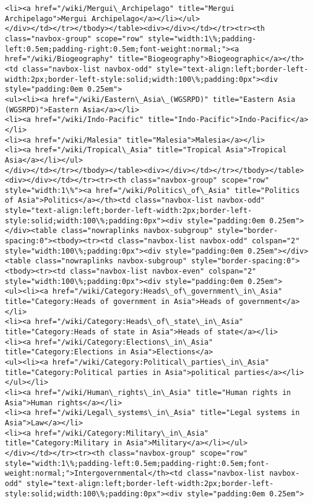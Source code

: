 \documentclass[11pt]{article}
\begin{document}
\begin{Verbatim}[commandchars=\\\{\}]
<li><a href="/wiki/Mergui\_Archipelago" title="Mergui Archipelago">Mergui Archipelago</a></li></ul>
</div></td></tr></tbody></table><div></div></td></tr><tr><th class="navbox-group" scope="row" style="width:1\%;padding-left:0.5em;padding-right:0.5em;font-weight:normal;"><a href="/wiki/Biogeography" title="Biogeography">Biogeographic</a></th><td class="navbox-list navbox-odd" style="text-align:left;border-left-width:2px;border-left-style:solid;width:100\%;padding:0px"><div style="padding:0em 0.25em">
<ul><li><a href="/wiki/Eastern\_Asia\_(WGSRPD)" title="Eastern Asia (WGSRPD)">Eastern Asia</a></li>
<li><a href="/wiki/Indo-Pacific" title="Indo-Pacific">Indo-Pacific</a></li>
<li><a href="/wiki/Malesia" title="Malesia">Malesia</a></li>
<li><a href="/wiki/Tropical\_Asia" title="Tropical Asia">Tropical Asia</a></li></ul>
</div></td></tr></tbody></table><div></div></td></tr></tbody></table><div></div></td></tr><tr><th class="navbox-group" scope="row" style="width:1\%"><a href="/wiki/Politics\_of\_Asia" title="Politics of Asia">Politics</a></th><td class="navbox-list navbox-odd" style="text-align:left;border-left-width:2px;border-left-style:solid;width:100\%;padding:0px"><div style="padding:0em 0.25em"></div><table class="nowraplinks navbox-subgroup" style="border-spacing:0"><tbody><tr><td class="navbox-list navbox-odd" colspan="2" style="width:100\%;padding:0px"><div style="padding:0em 0.25em"></div><table class="nowraplinks navbox-subgroup" style="border-spacing:0"><tbody><tr><td class="navbox-list navbox-even" colspan="2" style="width:100\%;padding:0px"><div style="padding:0em 0.25em">
<ul><li><a href="/wiki/Category:Heads\_of\_government\_in\_Asia" title="Category:Heads of government in Asia">Heads of government</a></li>
<li><a href="/wiki/Category:Heads\_of\_state\_in\_Asia" title="Category:Heads of state in Asia">Heads of state</a></li>
<li><a href="/wiki/Category:Elections\_in\_Asia" title="Category:Elections in Asia">Elections</a>
<ul><li><a href="/wiki/Category:Political\_parties\_in\_Asia" title="Category:Political parties in Asia">political parties</a></li></ul></li>
<li><a href="/wiki/Human\_rights\_in\_Asia" title="Human rights in Asia">Human rights</a></li>
<li><a href="/wiki/Legal\_systems\_in\_Asia" title="Legal systems in Asia">Law</a></li>
<li><a href="/wiki/Category:Military\_in\_Asia" title="Category:Military in Asia">Military</a></li></ul>
</div></td></tr><tr><th class="navbox-group" scope="row" style="width:1\%;padding-left:0.5em;padding-right:0.5em;font-weight:normal;">Intergovernmental</th><td class="navbox-list navbox-odd" style="text-align:left;border-left-width:2px;border-left-style:solid;width:100\%;padding:0px"><div style="padding:0em 0.25em">

\end{Verbatim}
\end{document}

